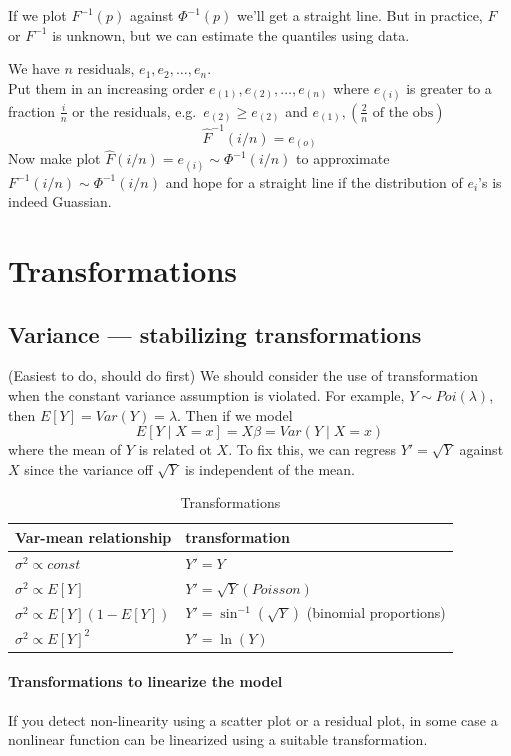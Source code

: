 \documentclass[12 pt]{article}
\begin{document}
\begin{enumerate}
\begin{itemize}
If we plot $F^{-1}(p)$ against $\Phi^{-1}(p)$ we'll get a straight
line. But in practice, $F$ or $F^{-1}$ is unknown, but we can estimate
the quantiles using data.

We have $n$ residuals, $e_1, e_2, \ldots, e_n$.
\\ Put them in an increasing order $e_{(1)}, e_{(2)}, \ldots, e_{(n)}$
where $e_{(i)}$ is greater to a fraction $\frac{i}{n}$ or the
residuals, e.g.\ $e_{(2)} \geq e_{(2)}$ and $e_{(1)},
\left(\frac{2}{n} \text{ of the obs}\right)$
$$\hat{F}^{-1}(i/n) = e_{(o)}$$
Now make  plot $\hat{F}(i/n) = e_{(i)} \sim \Phi^{-1}(i/n)$ to
approximate $F^{-1}(i/n) \sim \Phi^{-1}(i/n)$ and hope for a straight
line if the distribution of $e_i$'s is indeed Guassian.
\end{itemize}
\end{enumerate}
\section{Transformations}
\subsection{Variance --- stabilizing transformations}
(Easiest to do, should do first) We should consider the use of transformation when the constant
variance assumption is violated. For example, $Y \sim Poi(\lambda)$,
then $E[Y] = Var(Y) = \lambda$. Then if we model
$$E[Y \mid X = x] = X \beta = Var(Y \mid X = x)$$ where the mean of
$Y$ is related ot $X$. To fix this, we can regress $Y'=\sqrt{Y}$
against $X$ since the variance off $\sqrt{Y}$ is independent of the
mean.
\begin{table}[H]
  \centering
  \begin{tabular}{l l}
    Var-mean relationship & transformation
    \\ \hline$\sigma^2 \propto const$& $Y'=Y$
    \\ $\sigma^2 \propto E[Y]$ & $Y'=\sqrt{Y} (Poisson)$
    \\ $\sigma^2 \propto E[Y](1-E[Y])$ & $Y' = \sin^{-1}(\sqrt{Y})$ (binomial proportions)
    \\ $\sigma^2 \propto E[Y]^2$ & $Y'=\ln (Y)$
  \end{tabular}
  \caption{Transformations}
\end{table}
\paragraph{Transformations to linearize the model}
If you detect non-linearity using a scatter plot or a residual plot,
in some case a nonlinear function can be linearized using a suitable
transformation.
\end{document}
